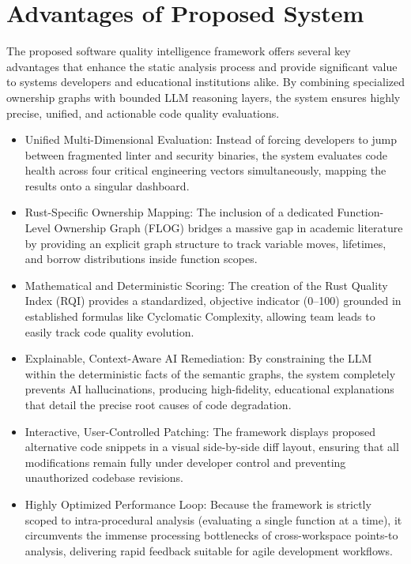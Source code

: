 \section{Advantages of Proposed System}
\hspace{0.5cm}
The proposed software quality intelligence framework offers several key advantages that enhance the static analysis process and provide significant value to systems developers and educational institutions alike. By combining specialized ownership graphs with bounded LLM reasoning layers, the system ensures highly precise, unified, and actionable code quality evaluations.

\begin{itemize}
\item Unified Multi-Dimensional Evaluation: Instead of forcing developers to jump between fragmented linter and security binaries, the system evaluates code health across four critical engineering vectors simultaneously, mapping the results onto a singular dashboard.
\item Rust-Specific Ownership Mapping: The inclusion of a dedicated Function-Level Ownership Graph (FLOG) bridges a massive gap in academic literature by providing an explicit graph structure to track variable moves, lifetimes, and borrow distributions inside function scopes.
\item Mathematical and Deterministic Scoring: The creation of the Rust Quality Index (RQI) provides a standardized, objective indicator (0–100) grounded in established formulas like Cyclomatic Complexity, allowing team leads to easily track code quality evolution.
\item Explainable, Context-Aware AI Remediation: By constraining the LLM within the deterministic facts of the semantic graphs, the system completely prevents AI hallucinations, producing high-fidelity, educational explanations that detail the precise root causes of code degradation.
\item Interactive, User-Controlled Patching: The framework displays proposed alternative code snippets in a visual side-by-side diff layout, ensuring that all modifications remain fully under developer control and preventing unauthorized codebase revisions.
\item Highly Optimized Performance Loop: Because the framework is strictly scoped to intra-procedural analysis (evaluating a single function at a time), it circumvents the immense processing bottlenecks of cross-workspace points-to analysis, delivering rapid feedback suitable for agile development workflows.
\end{itemize}

